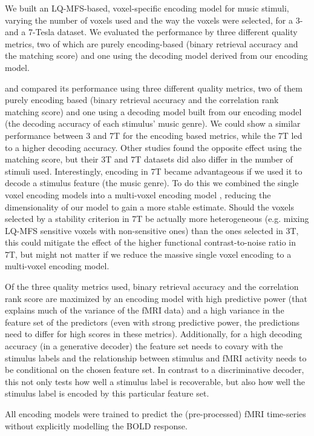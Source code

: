 We built an LQ-MFS-based, voxel-specific encoding model
for music stimuli, varying the number of voxels used and the way the voxels were
selected, for a 3- and a 7-Tesla dataset. We evaluated the performance by three
different quality metrics, two of which are purely encoding-based (binary
retrieval accuracy and the matching score) and one using the decoding model
derived from our encoding model. 

and compared its performance using three different quality metrics, two of them
purely encoding based (binary retrieval accuracy and the correlation rank
matching score) and one using a decoding model built from our encoding model
(the decoding accuracy of each stimulus' music genre). We could show a similar
performance between 3 and 7T for the encoding based metrics, while the 7T led
to a higher decoding accuracy. Other studies \citep[e.g.,][]{SF14} found the opposite
effect using the matching score, but their 3T and 7T datasets did also differ
in the number of stimuli used. Interestingly, encoding in 7T became
advantageous if we used it to decode a stimulus feature (the music genre). To
do this we combined the single voxel encoding models into a multi-voxel encoding
model \citep[see][]{NG09}, reducing the dimensionality of our model to gain a
more stable estimate. Should the voxels selected by a stability criterion in 7T
be actually more heterogeneous (e.g. mixing LQ-MFS sensitive voxels with
non-sensitive ones) than the ones selected in 3T, this could mitigate the
effect of the higher functional contrast-to-noise ratio in 7T, but might not
matter if we reduce the massive single voxel encoding to a multi-voxel encoding
model.

Of the three quality metrics used, binary retrieval accuracy and the
correlation rank score are maximized by an encoding model with high predictive
power (that explains much of the variance of the f{MRI} data) and a high
variance in the feature set of the predictors (even with strong predictive
power, the predictions need to differ for high scores in these metrics).
Additionally, for a high decoding accuracy (in a generative decoder) the
feature set needs to covary with the stimulus labels and the relationship
between stimulus and f{MRI} activity needs to be conditional on the chosen
feature set. In contrast to a discriminative decoder, this not only tests how
well a stimulus label is recoverable, but also how well the stimulus label is
encoded by this particular feature set.

All encoding models were trained to predict the (pre-processed) f{MRI}
time-series without explicitly modelling the BOLD response. 


